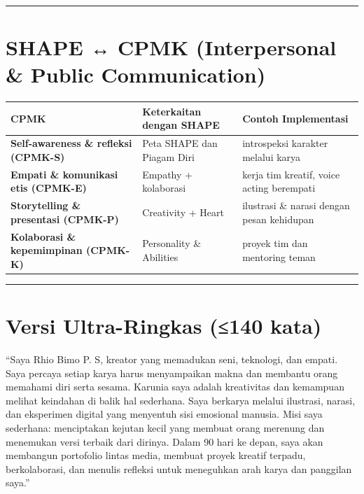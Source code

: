 \documentclass[
  letterpaper,
  DIV=11,
  numbers=noendperiod]{scrreprt}
\begin{document}
\begin{center}\rule{0.5\linewidth}{0.5pt}\end{center}

\section{SHAPE ↔ CPMK (Interpersonal \& Public
Communication)}\label{shape-cpmk-interpersonal-public-communication}

\begin{longtable}[]{@{}
  >{\raggedright\arraybackslash}p{}
  >{\raggedright\arraybackslash}p{}
  >{\raggedright\arraybackslash}p{}@{}}
\toprule\noalign{}
\begin{minipage}[b]{\linewidth}\raggedright
CPMK
\end{minipage} & \begin{minipage}[b]{\linewidth}\raggedright
Keterkaitan dengan SHAPE
\end{minipage} & \begin{minipage}[b]{\linewidth}\raggedright
Contoh Implementasi
\end{minipage} \\
\midrule\noalign{}
\endhead
\bottomrule\noalign{}
\endlastfoot
\textbf{Self-awareness \& refleksi (CPMK-S)} & Peta SHAPE dan Piagam
Diri & introspeksi karakter melalui karya \\
\textbf{Empati \& komunikasi etis (CPMK-E)} & Empathy + kolaborasi &
kerja tim kreatif, voice acting berempati \\
\textbf{Storytelling \& presentasi (CPMK-P)} & Creativity + Heart &
ilustrasi \& narasi dengan pesan kehidupan \\
\textbf{Kolaborasi \& kepemimpinan (CPMK-K)} & Personality \& Abilities
& proyek tim dan mentoring teman \\
\end{longtable}

\begin{center}\rule{0.5\linewidth}{0.5pt}\end{center}

\section{Versi Ultra-Ringkas (≤140
kata)}\label{versi-ultra-ringkas-140-kata}

``Saya Rhio Bimo P. S, kreator yang memadukan seni, teknologi, dan
empati. Saya percaya setiap karya harus menyampaikan makna dan membantu
orang memahami diri serta sesama. Karunia saya adalah kreativitas dan
kemampuan melihat keindahan di balik hal sederhana. Saya berkarya
melalui ilustrasi, narasi, dan eksperimen digital yang menyentuh sisi
emosional manusia. Misi saya sederhana: menciptakan kejutan kecil yang
membuat orang merenung dan menemukan versi terbaik dari dirinya. Dalam
90 hari ke depan, saya akan membangun portofolio lintas media, membuat
proyek kreatif terpadu, berkolaborasi, dan menulis refleksi untuk
meneguhkan arah karya dan panggilan saya.''
\end{document}
